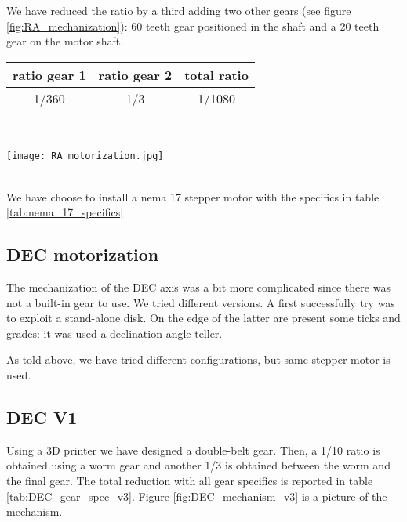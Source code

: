 We have reduced the ratio by a third adding two other gears (see figure \ref{fig:RA_mechanization}): 60 teeth gear positioned in the shaft and a 20 teeth gear on the motor shaft.
\\
\begin{minipage}{.4\textwidth}
    \centering
    \begin{tabular}{cc|c}
        ratio gear 1 & ratio gear 2 & total ratio \\
        \hline
        1/360 & 1/3 & 1/1080 \\
        \hline
    \end{tabular}
    \label{tab:RA_mechanization}
\end{minipage}
\\
\begin{minipage}{.4\textwidth}
    \centering
    \texttt{[image: RA\_motorization.jpg]}  
    \label{fig:RA_mechanization}         
\end{minipage}
\\
We have choose to install a nema 17 stepper motor with the specifics in table \ref{tab:nema_17_specifics}

\subsection{DEC motorization}
The mechanization of the DEC axis was a bit more complicated since there was not a built-in gear to use.
We tried different versions.
A first successfully try was to exploit a stand-alone disk.
On the edge of the latter are present some ticks and grades: it was used a declination angle teller.

As told above, we have tried different configurations, but same stepper motor is used.

\subsection{DEC V1}
Using a 3D printer we have designed a double-belt gear.
Then, a 1/10 ratio is obtained using a worm gear and another 1/3 is obtained between the worm and the final gear.
The total reduction with all gear specifics is reported in table \ref{tab:DEC_gear_spec_v3}.
Figure \ref{fig:DEC_mechanism_v3} is a picture of the mechanism.

